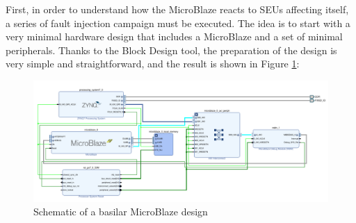 First, in order to understand how the MicroBlaze reacts to SEUs affecting itself, a series of fault injection campaign must be executed. The idea is to start with a very minimal hardware design that includes a MicroBlaze and a set of minimal peripherals. Thanks to the Block Design tool, the preparation of the design is very simple and straightforward, and the result is shown in Figure \ref{fig:base_mb}:

\begin{figure}[H]
\centering
\includegraphics[width=1.0\linewidth]{images/chapter4/mb_base_design_edit.pdf}
\caption{Schematic of a basilar MicroBlaze design}
\label{fig:base_mb}
\end{figure}

